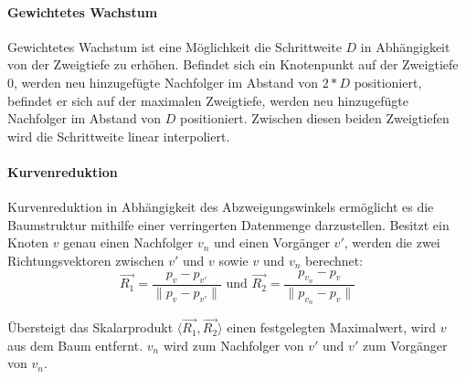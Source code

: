\paragraph{Gewichtetes Wachstum}

Gewichtetes Wachstum ist eine Möglichkeit die Schrittweite $D$ in Abhängigkeit von der Zweigtiefe zu erhöhen. Befindet sich ein Knotenpunkt auf der Zweigtiefe $0$, werden neu hinzugefügte Nachfolger im Abstand von $2 * D$ positioniert, befindet er sich auf der maximalen Zweigtiefe, werden neu hinzugefügte Nachfolger im Abstand von $D$ positioniert. Zwischen diesen beiden Zweigtiefen wird die Schrittweite linear interpoliert.

\paragraph{Kurvenreduktion}
 
Kurvenreduktion in Abhängigkeit des Abzweigungswinkels ermöglicht es die Baumstruktur mithilfe einer verringerten Datenmenge darzustellen. Besitzt ein Knoten $v$ genau einen Nachfolger $v_n$ und einen Vorgänger $v'$, werden die zwei Richtungsvektoren zwischen $v'$ und $v$ sowie $v$ und $v_n$ berechnet:
\begin{equation}
\overrightarrow{R_1} = \dfrac{p_v - p_{v'}}{\lVert p_v - p_{v'} \rVert} \text{ und } \overrightarrow{R_2} = \dfrac{p_{v_n} - p_{v}}{\lVert p_{v_n} - p_{v} \rVert}
\end{equation}

Übersteigt das Skalarprodukt $\langle \overrightarrow{R_1}, \overrightarrow{R_2} \rangle$ einen festgelegten Maximalwert, wird $v$ aus dem Baum entfernt. $v_n$ wird zum Nachfolger von $v'$ und $v'$ zum Vorgänger von $v_n$. 